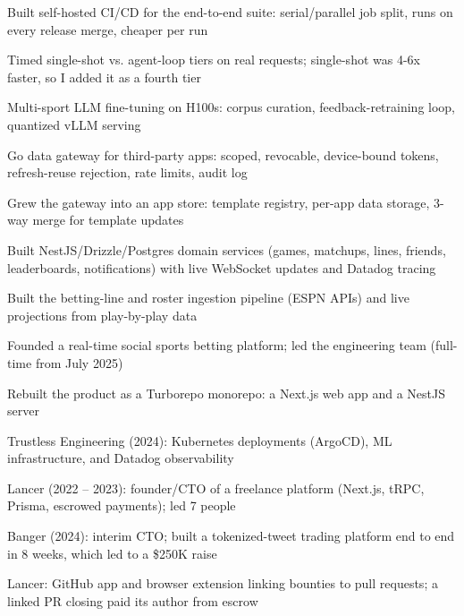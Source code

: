 \documentclass[print]{jack-resume}
\begin{document}
\begin{tightemize}
    \item Built self-hosted CI/CD for the end-to-end suite: serial/parallel job split, runs on every release merge, cheaper per run
    \item Timed single-shot vs. agent-loop tiers on real requests; single-shot was 4-6x faster, so I added it as a fourth tier
    \item Multi-sport LLM fine-tuning on H100s: corpus curation, feedback-retraining loop, quantized vLLM serving
    \item Go data gateway for third-party apps: scoped, revocable, device-bound tokens, refresh-reuse rejection, rate limits, audit log
    \item Grew the gateway into an app store: template registry, per-app data storage, 3-way merge for template updates
\end{tightemize}
\sectionsep

\begin{tightemize}
    \item Built NestJS/Drizzle/Postgres domain services (games, matchups, lines, friends, leaderboards, notifications) with live WebSocket updates and Datadog tracing
    \item Built the betting-line and roster ingestion pipeline (ESPN APIs) and live projections from play-by-play data
    \item Founded a real-time social sports betting platform; led the engineering team (full-time from July 2025)
    \item Rebuilt the product as a Turborepo monorepo: a Next.js web app and a NestJS server
\end{tightemize}
\sectionsep

\begin{tightemize}
    \item Trustless Engineering (2024): Kubernetes deployments (ArgoCD), ML infrastructure, and Datadog observability
    \item Lancer (2022 -- 2023): founder/CTO of a freelance platform (Next.js, tRPC, Prisma, escrowed payments); led 7 people
    \item Banger (2024): interim CTO; built a tokenized-tweet trading platform end to end in 8 weeks, which led to a \$250K raise
    \item Lancer: GitHub app and browser extension linking bounties to pull requests; a linked PR closing paid its author from escrow
\end{tightemize}
\sectionsep
\end{document}
